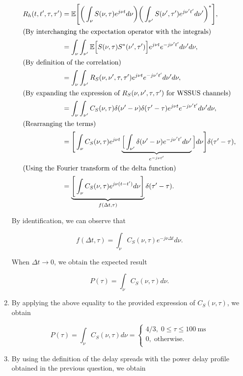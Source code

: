 \documentclass [a4paper, 11pt] {article}
\begin{document}
\begin{solution}
\begin{enumerate}
            \begin{align}
                R_h(t,t',\tau,\tau') &= \mathbb{E}\Bigg[ \bigg(\int_{\nu} S(\nu,\tau)e^{j\nu t}d\nu \bigg)  \bigg( \int_{\nu'} S(\nu',\tau')e^{j\nu' t'}d\nu'\bigg)^*  \Bigg], \\ \intertext{(By interchanging the expectation operator with the integrals)}
                &= \int_{\nu}\int_{\nu'} \mathbb{E}\Big[S(\nu,\tau)S^*(\nu',\tau') \Big]e^{j\nu t}e^{-j\nu' t'}d\nu'd\nu, \\ \intertext{(By definition of the correlation)}
                &= \int_{\nu}\int_{\nu'} R_S(\nu, \nu', \tau, \tau') e^{j\nu t}e^{-j\nu' t'}d\nu'd\nu, \\ \intertext{(By expanding the expression of $ R_S(\nu, \nu', \tau, \tau')$ for WSSUS channels)}
                &= \int_{\nu}\int_{\nu'} C_S(\nu,\tau) \delta(\nu' - \nu) \delta(\tau' - \tau) e^{j\nu t}e^{-j\nu' t'}d\nu'd\nu,\\ \intertext{(Rearranging the terms)}
                &= \Bigg[ \int_{\nu} C_S(\nu,\tau) e^{j\nu t} \underbrace{\Big[\int_{\nu'} \delta(\nu' - \nu)  e^{-j\nu' t'} d\nu'}_{e^{-j\nu t'}} \Big] d\nu \Bigg]\delta(\tau' - \tau),\\\intertext{(Using the Fourier transform of the delta function)}
                &= \underbrace{\Bigg[\int_{\nu} C_S(\nu,\tau) e^{j\nu (t-t')}d\nu \Bigg]}_{f(\Delta t,\tau)} \delta(\tau' - \tau).
            \end{align}
            
            By identification, we can observe that 
            
            \begin{equation}f(\Delta t,\tau) = \int_{\nu} C_S(\nu,\tau) e^{-j\nu \Delta t }d\nu.
            \end{equation}
            
            When $\Delta t \rightarrow 0$, we obtain the expected result
            
            \begin{equation}P(\tau) = \int_{\nu} C_S(\nu, \tau) d\nu.
            \end{equation}
            
            \item By applying the above equality to the provided expression of $C_S(\nu, \tau)$, we obtain
            
            \begin{equation}
                P(\tau) = \int_{\nu} C_S(\nu, \tau) d\nu = \left\{
                        \begin{array}{ll}
                          4/3, \; 0 \leq \tau \leq \SI{100}{\milli\second}\\
                          0, \; \text{otherwise}. \\
                        \end{array}
                      \right.
            \end{equation}
            \item By using the definition of the delay spreads with the power delay profile obtained in the previous question, we obtain
            

\end{enumerate}
\end{solution}
\end{document}
